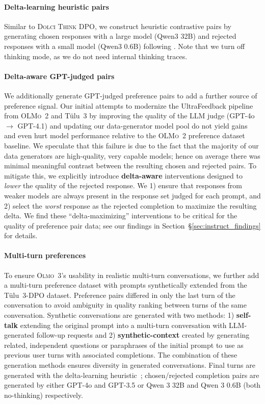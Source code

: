 \documentclass[table]{ai2style/ai2}
\newcommand{\oldOlmo}{OLMo\xspace}
\newcommand{\newOlmo}{Olmo\xspace}
\newcommand{\tulu}{T\"ulu~3\xspace}
\newcommand{\olmotoo}{\textsc{\oldOlmo~2}\xspace}
\newcommand{\olmothree}{\textsc{\newOlmo~3}\xspace}
\newcommand{\dolcithinkdpo}{\textsc{Dolci Think DPO}\xspace}
\begin{document}
{{\paragraph{Delta-learning heuristic pairs} Similar to \dolcithinkdpo, we construct heuristic contrastive pairs by generating chosen responses with a large model (Qwen3 32B) and rejected responses with a small model (Qwen3 0.6B) following \cite{geng2025delta}. Note that we turn off thinking mode, as we do not need internal thinking traces.

\paragraph{Delta-aware GPT-judged pairs} We additionally generate GPT-judged preference pairs to add a further source of preference signal. Our initial attempts to modernize the UltraFeedback pipeline from \olmotoo and \tulu by improving the quality of the LLM judge (GPT-4o $\rightarrow$ GPT-4.1) and updating our data-generator model pool do not yield gains and even hurt model performance relative to the \olmotoo preference dataset baseline. 
We speculate that this failure is due to the fact that the majority of our data generators are high-quality, very capable models; 
hence on average there was minimal meaningful contrast between the resulting chosen and rejected pairs. 
To mitigate this, we explicitly introduce {\bf{delta-aware}} interventions designed to \textit{lower} the quality of the rejected response. We 1) ensure that responses from weaker models are always present in the response set judged for each prompt, and 2) select the \textit{worst} response as the rejected completion to maximize the resulting delta. 
We find these ``delta-maximizing'' interventions to be critical for the quality of preference pair data; see our findings in Section~\S\ref{sec:instruct_findings} for details.

\paragraph{Multi-turn preferences} To ensure \olmothree's usability in realistic multi-turn conversations, we further add a multi-turn preference dataset with prompts synthetically extended from the \tulu-DPO dataset. Preference pairs differed in only the last turn of the conversation to avoid ambiguity in quality ranking between turns of the same conversation. Synthetic conversations are generated with two methods: 1) {\bf{self-talk}} extending the original prompt into a multi-turn conversation with LLM-generated follow-up requests and 2) {\bf{synthetic-context}} created by generating related, independent questions or paraphrases of the initial prompt to use as previous user turns with associated completions. The combination of these generation methods ensures diversity in generated conversations. Final turns are generated with the delta-learning heuristic~\citep{geng2025delta}; chosen/rejected completion pairs are generated by either GPT-4o and GPT-3.5 or Qwen 3 32B and Qwen 3 0.6B (both no-thinking) respectively.

}}
\end{document}
